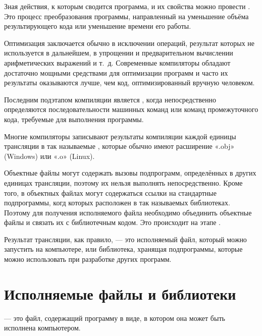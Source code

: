 Зная действия, к которым сводится программа, и их свойства можно
провести . Это процесс преобразования
программы, направленный на уменьшение объёма результирующего кода или
уменьшение времени его работы.

Оптимизация заключается обычно в исключении операций, результат
которых не используется в дальнейшем, в упрощении и предварительном
вычислении арифметических выражений и т.~д. Современные компиляторы
обладают достаточно мощными средствами для оптимизации программ и
часто их результаты оказываются лучше, чем код, оптимизированный
вручную человеком.


Последним подэтапом компиляции является , когда непосредственно определяются
последовательности машинных команд или команд промежуточного кода,
требуемые для выполнения программы.

Многие компиляторы записывают результаты компиляции каждой единицы
трансляции в так называемые ,
которые обычно имеют расширение «.obj» (Windows) или «.o» (Linux).

Объектные файлы могут содержать вызовы подпрограмм, определённых в
других единицах трансляции, поэтому их нельзя выполнять
непосредственно.  Кроме того, в объектных файлах могут содержаться
ссылки на стандартные подпрограммы, когд которых расположен в так
называемых библиотеках.  Поэтому для получения исполняемого файла
необходимо объединить объектные файлы и связать их с библиотечным
кодом. Это происходит на этапе .

Результат трансляции, как правило, — это исполняемый файл, который
можно запустить на компьютере, или библиотека, хранящая подпрограммы,
которые можно использовать при разработке других программ.

\section{Исполняемые файлы и библиотеки}

\begin{defn}
   — это файл, содержащий
  программу в виде, в котором она может быть исполнена компьютером.
\end{defn}

